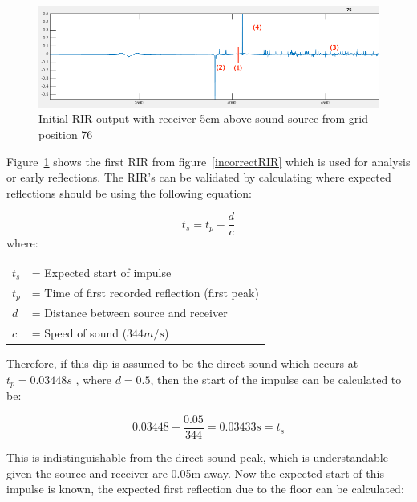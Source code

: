 \documentclass[../../main.tex]{subfiles}
\begin{document}
			\begin{figure}[H]
				\centerline{\includegraphics[scale = 0.5]{Sections/Implementation/Odeon/images/incorrectRIR/RIR_76_incorrect_edit_crop.png}}
				\caption{Initial \ac{RIR} output with receiver 5cm above sound source from grid position 76}
				\label{incorrectRIR_76}
			\end{figure}

			Figure~\ref{incorrectRIR_76} shows the first \ac{RIR} from figure~\ref{incorrectRIR} which is used for analysis or early reflections. The \ac{RIR}'s can be validated by calculating where expected reflections should be using the following equation:
			
			\begin{equation}\label{distance}
				t_s = t_p - \frac{d}{c}
			\end{equation}
			where:

			\begin{tabular}{l l}
			$t_s$ & = Expected start of impulse \\
			$t_p$ & = Time of first recorded reflection (first peak) \\
			$d$ & = Distance between source and receiver\\
			$c$ & = Speed of sound ($344m/s$) \\
			\end{tabular}


			Therefore, if this dip is assumed to be the direct sound which occurs at $t_p = 0.03448s$ , where $d = 0.5$, then the start of the impulse can be calculated to be:

			\begin{equation}
			 0.03448 - \frac{0.05}{344} = 0.03433s = t_s
			\end{equation}

			This is indistinguishable from the direct sound peak, which is understandable given the source and receiver are 0.05m away. Now the expected start of this impulse is known, the expected first reflection due to the floor can be calculated:
\end{document}
